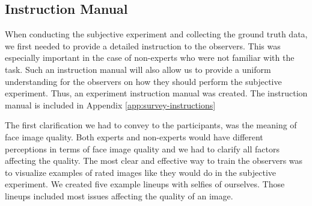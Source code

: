 \subsection{Instruction Manual}
\label{sec:intromanual}
When conducting the subjective experiment and collecting the ground truth data, we first needed to provide a detailed instruction to the observers. This was especially important in the case of non-experts who were not familiar with the task. Such an instruction manual will also allow us to provide a uniform understanding for the observers on how they should perform the subjective experiment. Thus, an experiment instruction manual was created. The instruction manual is included in Appendix \ref{app:survey-instructions} 

The first clarification we had to convey to the participants, was the meaning of face image quality. Both experts and non-experts would have different perceptions in terms of face image quality and we had to clarify all factors affecting the quality. The most clear and effective way to train the observers was to visualize examples of rated images like they would do in the subjective experiment. We created five example lineups with selfies of ourselves. Those lineups included most issues affecting the quality of an image. 

